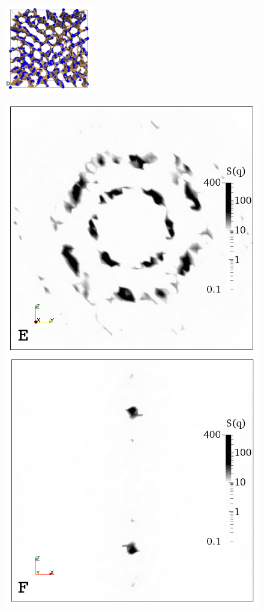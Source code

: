 \documentclass[12pt]{article}
\begin{document}
\begin{figure}
{\begin{minipage}[t]{0.17\textwidth}
\end{minipage}
\includegraphics[width=0.35\textwidth]{col_disc_x_run1341.png}
\begin{minipage}[t]{0.17\textwidth}
\vspace*{-4.6cm}
\includegraphics[width=\textwidth]{sq_x_run1341.png}
\includegraphics[width=\textwidth]{sq_y_run1341.png}

\end{minipage}}
\end{figure}
\end{document}
